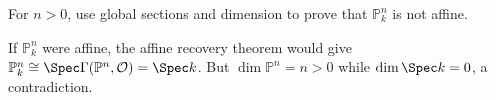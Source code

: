 \begin{problem}\label{prob:vi36-12}
For \(n>0\), use global sections and dimension to prove that \(\mathbb P^n_k\) is not affine.
\begin{solution}
If \(\mathbb P^n_k\) were affine, the affine recovery theorem would give \(\mathbb P^n_k\cong\Spec\Gamma(\mathbb P^n,\mathcal O)=\Spec k\).  But \(\dim\mathbb P^n=n>0\) while \(\dim\Spec k=0\), a contradiction.
\end{solution}
\end{problem}
